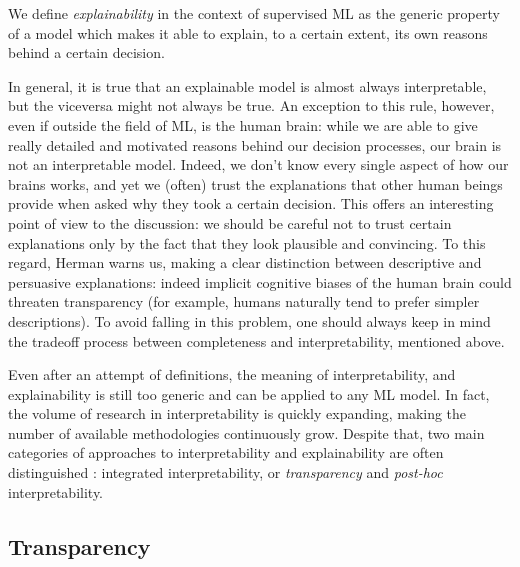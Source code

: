 \begin{definition}[Explainability]
	\label{def:explainability}
	We define \textit{explainability} in the context of supervised ML as the generic property of a model which makes it able to explain, to a certain extent, its own reasons behind a certain decision.
\end{definition}

In general, it is true that an explainable model is almost always interpretable, but the viceversa might not always be true. An exception to this rule, however, even if outside the field of ML, is the human brain: while we are able to give really detailed and motivated reasons behind our decision processes, our brain is not an interpretable model. Indeed, we don't know every single aspect of how our brains works, and yet we (often) trust the explanations that other human beings provide when asked why they took a certain decision. This offers an interesting point of view to the discussion: we should be careful not to trust certain explanations only by the fact that they look plausible and convincing. To this regard, Herman \cite{Herman2017ThePA} warns us, making a clear distinction between descriptive and persuasive explanations: indeed implicit cognitive biases of the human brain could threaten transparency (for example, humans naturally tend to prefer simpler descriptions). To avoid falling in this problem, one should always keep in mind the tradeoff process between completeness and interpretability, mentioned above.

Even after an attempt of definitions, the meaning of interpretability, and explainability is still too generic and can be applied to any ML model. In fact, the volume of research in interpretability is quickly expanding, making the number of available methodologies continuously grow. Despite that, two main categories of approaches to interpretability and explainability are often distinguished \cite{dosilovic2018explainable, lipton2017mythos}: integrated interpretability, or \textit{transparency} and \textit{post-hoc} interpretability.

\subsection{Transparency}

